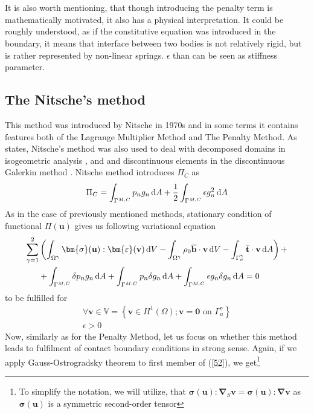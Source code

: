 \documentclass{article}
\newcommand{\beq}{\begin{equation}}
\newcommand{\eeq}{\end{equation}}
\newcommand{\bea}{\begin{eqnarray}}
\newcommand{\eea}{\end{eqnarray}}
\newcommand{\dd}{\,{\rm d}}
\begin{document}
\\
\\
It is also worth mentioning, that though introducing the penalty term is mathematically motivated, it also has a physical interpretation. It could be roughly understood, as if the constitutive equation was introduced in the boundary, it means that interface between two bodies is not relatively rigid, but is rather represented by non-linear springs. $\epsilon$ than can be seen as stiffness parameter.   
\subsection{The Nitsche's method}
This method was introduced by Nitsche in 1970s \cite{Nitsche} and in some terms it contains features both of the Lagrange Multiplier Method and The Penalty Method. As \cite{Augarde} states, Nitsche's method was also used to deal with decomposed domains in isogeometric analysis \cite{Apostolatos}, \cite{Ruess} and and discontinuous elements in the discontinuous Galerkin method \cite{Hansbo}. Nitsche method introduces $\Pi_{C}$ as 
\beq\label{59}
\Pi_{C} = \int_{\Gamma^{M,C}} p_{n} g_{n}\dd A+\frac{1}{2}\int_{\Gamma^{M,C}} \epsilon g^{2}_{n}\dd A
\eeq   
As in the case of previously mentioned methods, stationary condition of functional $\Pi (\mathbf{u})$ gives us following variational equation
\bea\label{60}
\begin{aligned}
\sum^{2}_{\gamma = 1}&\left(\int_{\Omega^{\gamma}} \bm{\sigma}(\mathbf{u}) : \bm{\varepsilon}(\mathbf{v}) \dd V-\int_{\Omega^{\gamma}} \rho_{0}\overline{\mathbf{b}} \cdot \mathbf{v} \dd V-\int_{\Gamma_{\sigma}^{\gamma}} \overline{\mathbf{t}} \cdot \mathbf{\mathbf{v}} \dd A\right)+
\\
&+\int_{\Gamma^{M,C}} \delta p_{n} g_{n}\dd A+\int_{\Gamma^{M,C}} p_{n} \delta g_{n}\dd A+\int_{\Gamma^{M,C}} \epsilon g_{n} \delta g_{n} \dd A = 0
\end{aligned}
\eea
to be fulfilled for    
\beq\label{61}
\begin{array}{c}
{\forall\mathbf{v}\in {\mathbb{V}=\left\{\mathbf{v} \in H^{1}(\Omega); \mathbf{v}=\mathbf{0} \text { on } \Gamma_{u}^{\gamma}\right\}}}
\\
{\epsilon > 0}
\end{array}
\eeq 
Now, similarly as for the Penalty Method, let us focus on whether this method leads to fulfilment of contact boundary conditions in strong sense. Again, if we apply Gauss-Ostrogradsky theorem to first member of (\ref{52}), we get\footnote{To simplify the notation, we will utilize, that $  \bm{\sigma}(\mathbf{u}) : \bm{\nabla}_{S}\mathbf{v} = \bm{\sigma}(\mathbf{u}) : \bm{\nabla}\mathbf{v} $ as $\bm{\sigma}(\mathbf{u})$ is a symmetric second-order tensor}
\end{document}
